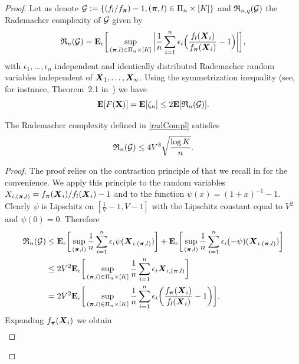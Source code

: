\begin{proof}
	Let us denote $\mathcal G:=\{(f_l/f_{\boldsymbol \pi})-1, (\boldsymbol \pi,l)\in\Pi_n\times [K]\}$ and $\mathfrak{R}_{n,q}(\mathcal G)$ the Rademacher
	complexity of $\mathcal G$ given by
	\begin{equation}
	\label{radCompl}
	\mathfrak{R}_{n}(\mathcal G) = \mathbf E_{\epsilon}\bigg[ \sup_{(\boldsymbol \pi,l)\in\Pi_n\times[K]}\bigg| \frac{1}{n}\sum_{i=1}^n
	\epsilon_i\Big(\frac{f_l(\boldsymbol X_i)}{f_{\boldsymbol \pi}(\boldsymbol X_i)}-1\Big)\bigg| \bigg],
	\end{equation}
	with $\epsilon_1,\dots,\epsilon_n$ independent and identically distributed Rademacher random variables independent
	of $\boldsymbol X_1,\dots,\boldsymbol X_n$. Using the symmetrization inequality (see, for instance, Theorem~2.1 in~\cite{KoltBook2011})
	we have
	\begin{equation}
	\label{rademacher}
	\mathbf E[F(\mathbf X)] = \mathbf E[\zeta_n] \leq 2\mathbf E[\mathfrak{R}_{n}(\mathcal G)].
	\end{equation}
	\begin{lemma}
		\label{boundRademComplex}
		The Rademacher complexity defined in \eqref{radCompl} satisfies
		\begin{equation}
		\mathfrak{R}_n(\mathcal G) \leq  4V^3\sqrt{\frac{\log K}{n}}.
		\end{equation}
	\end{lemma}
	\begin{proof}
		The proof relies on the contraction principle of \cite{LedouxTal:91} that we recall in
		 for the convenience. We apply this principle to the random variables
		$X_{i,(\boldsymbol \pi,l)}=f_{\boldsymbol \pi}(\boldsymbol X_i)/f_l(\boldsymbol X_i)-1$ and to the function $\psi(x) = (1+x)^{-1}-1$.
		Clearly $\psi$ is Lipschitz on
		$[\frac{1}{V}-1,V-1]$ with the Lipschitz constant equal to $V^2$ and $\psi(0)=0$. Therefore
		\begin{align}
		\mathfrak{R}_{n}(\mathcal G)
		& \le  \mathbf E_{\epsilon}\bigg[ \sup_{(\boldsymbol \pi,l)} \frac{1}{n}\sum_{i=1}^n
		\epsilon_i\psi(\boldsymbol X_{i,(\boldsymbol \pi,l)})\bigg]
		+\mathbf E_{\epsilon}\bigg[ \sup_{(\boldsymbol \pi,l)}\frac{1}{n}\sum_{i=1}^n
		\epsilon_i(-\psi)(\boldsymbol X_{i,(\boldsymbol \pi,l)})\bigg]\nonumber\\
		&\leq 2V^2\mathbf E_{\epsilon}\bigg[ \sup_{(\boldsymbol \pi,l)\in\Pi_n\times[K]}\frac{1}{n}
		\sum_{i=1}^n \epsilon_i \boldsymbol X_{i,(\boldsymbol \pi,l)} \bigg]\nonumber\\
		&= 2V^2 \mathbf E_{\epsilon}\bigg[ \sup_{(\boldsymbol \pi,l)\in\Pi_n\times[K]}\frac{1}{n}\sum_{i=1}^n \epsilon_i
		\bigg(\frac{f_{\boldsymbol \pi}(\boldsymbol X_i)}{f_l(\boldsymbol X_i)} -1\bigg) \bigg].
		\end{align}
		Expanding $f_{\boldsymbol \pi}(\boldsymbol X_i)$ we obtain
		\begin{align}

\end{align}
\end{proof}
\end{proof}
